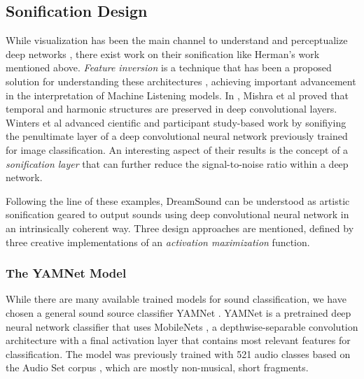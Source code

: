 \documentclass[a4paper,10pt,oneside]{article}
\begin{document}
\begin{sloppy}
\subsection{Sonification Design}

While visualization has been the main channel to understand and perceptualize deep networks \cite{simonyan2014deep}, there exist work on their sonification like Herman's work mentioned above. \textit{Feature inversion} is a technique that has been a proposed solution for understanding these architectures \cite{mahendran2014understanding, dosovitskiy2016inverting}, achieving important advancement in the interpretation of Machine Listening models. In \cite{saumitra_mishra_2018_1492527}, Mishra et al proved that temporal and harmonic structures are preserved in deep convolutional layers. Winters et al \cite{Winters2019} advanced cientific and participant study-based work by sonifiying the penultimate layer of a deep convolutional neural network previously trained for image classification. An interesting aspect of their results is the concept of a \textit{sonification layer} that can further reduce the signal-to-noise ratio within a deep network. 

Following the line of these examples, DreamSound can be understood as artistic sonification geared to output sounds using deep convolutional neural network in an intrinsically coherent way. Three design approaches are mentioned, defined by three creative implementations of an \textit{activation maximization} function.

\subsubsection{The YAMNet Model}
\label{subsec:yamnet}
While there are many available trained models for sound classification, we have chosen a general sound source classifier YAMNet \cite{YamNet2020}. YAMNet is a pretrained deep neural network classifier that uses MobileNets \cite{howard2017mobilenets}, a depthwise-separable convolution architecture with a final activation layer that contains most relevant features for classification. The model was previously trained with 521 audio classes based on the Audio  Set corpus \cite{2017audioset}, which are mostly non-musical, short fragments. 


\end{sloppy}
\end{document}
